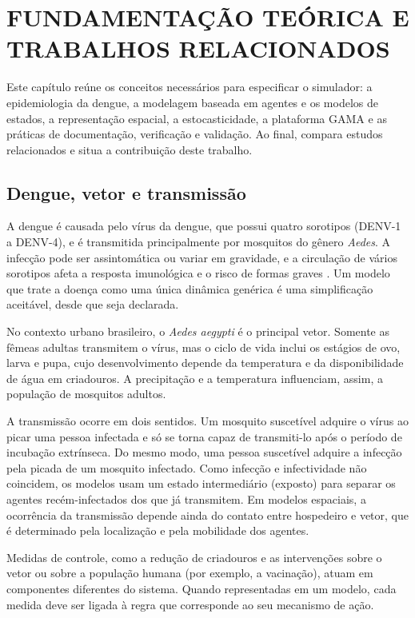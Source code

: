 \chapter{FUNDAMENTAÇÃO TEÓRICA E TRABALHOS RELACIONADOS}
\label{cap:fundamentacao}

Este capítulo reúne os conceitos necessários para especificar o simulador: a epidemiologia da dengue, a modelagem baseada em agentes e os modelos de estados, a representação espacial, a estocasticidade, a plataforma GAMA e as práticas de documentação, verificação e validação. Ao final, compara estudos relacionados e situa a contribuição deste trabalho.

\section{Dengue, vetor e transmissão}

A dengue é causada pelo vírus da dengue, que possui quatro sorotipos (DENV-1 a DENV-4), e é transmitida principalmente por mosquitos do gênero \textit{Aedes}. A infecção pode ser assintomática ou variar em gravidade, e a circulação de vários sorotipos afeta a resposta imunológica e o risco de formas graves \cite{WHO2023}. Um modelo que trate a doença como uma única dinâmica genérica é uma simplificação aceitável, desde que seja declarada.

No contexto urbano brasileiro, o \textit{Aedes aegypti} é o principal vetor. Somente as fêmeas adultas transmitem o vírus, mas o ciclo de vida inclui os estágios de ovo, larva e pupa, cujo desenvolvimento depende da temperatura e da disponibilidade de água em criadouros. A precipitação e a temperatura influenciam, assim, a população de mosquitos adultos.

A transmissão ocorre em dois sentidos. Um mosquito suscetível adquire o vírus ao picar uma pessoa infectada e só se torna capaz de transmiti-lo após o período de incubação extrínseca. Do mesmo modo, uma pessoa suscetível adquire a infecção pela picada de um mosquito infectado. Como infecção e infectividade não coincidem, os modelos usam um estado intermediário (exposto) para separar os agentes recém-infectados dos que já transmitem. Em modelos espaciais, a ocorrência da transmissão depende ainda do contato entre hospedeiro e vetor, que é determinado pela localização e pela mobilidade dos agentes.

Medidas de controle, como a redução de criadouros e as intervenções sobre o vetor ou sobre a população humana (por exemplo, a vacinação), atuam em componentes diferentes do sistema. Quando representadas em um modelo, cada medida deve ser ligada à regra que corresponde ao seu mecanismo de ação.

